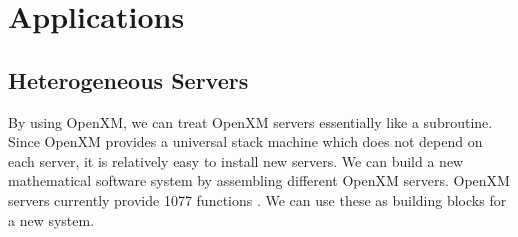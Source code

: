 \section{Applications}

\subsection{Heterogeneous Servers}

\def\pd#1{ \partial_{#1} }

By using OpenXM, we can treat OpenXM servers essentially 
like a subroutine.
Since OpenXM provides a universal stack machine which does not
depend on each server, 
it is relatively easy to install new servers.
We can build a new mathematical software system by assembling
different OpenXM servers.
OpenXM servers currently provide 1077 functions
\cite{openxm-1077}.
We can use these as building blocks for a new system.


%

